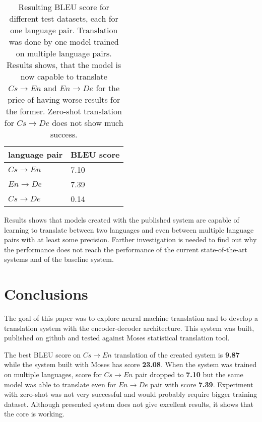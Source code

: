 \documentclass{ExcelAtFIT}
\begin{document}
\begin{table}[h!]
	\caption{Resulting BLEU score for different test datasets, each for one language pair. Translation was done by one model trained on multiple language pairs. Results shows, that the model is now capable to translate $Cs\rightarrow En$ and $En\rightarrow De$ for the price of having worse results for the former. Zero-shot translation for $Cs\rightarrow De$ does not show much success.}
	\label{table:resultsMulti}
    \begin{center}
        \begin{tabular}{ll}
          \toprule
          language pair & BLEU score \\
          \midrule
          $Cs\rightarrow En$ & 7.10 \\
          $En\rightarrow De$ & 7.39 \\
          $Cs\rightarrow De$ & 0.14 \\
          \bottomrule
        \end{tabular}
    \end{center}
\end{table}

Results shows that models created with the published system are capable of learning to translate between two languages and even between multiple language pairs with at least some precision. Farther investigation is needed to find out why the performance does not reach the performance of the current state-of-the-art systems and of the baseline system.

\section{Conclusions}\label{sec:Conclusions}

The goal of this paper was to explore neural machine translation and to develop a translation system with the encoder-decoder architecture. This system was built, published on github and tested against Moses statistical translation tool.

The best BLEU score on $Cs\rightarrow En$ translation of the created system is \textbf{9.87} while the system built with Moses has score \textbf{23.08}. When the system was trained on multiple languages, score for $Cs\rightarrow En$ pair dropped to \textbf{7.10} but the same model was able to translate even for $En\rightarrow De$ pair with score \textbf{7.39}. Experiment with zero-shot was not very successful and would probably require bigger training dataset. Although presented system does not give excellent results, it shows that the core is working.
\end{document}
